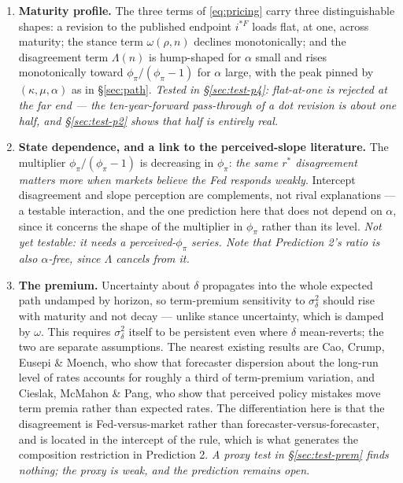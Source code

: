 \documentclass[11pt]{article}
\begin{document}
\begin{enumerate}
and downward disagreements are mirror images. Caballero \& Simsek's premium is genuinely
sign-dependent; this model is not, and the differentiation from them rests on the maturity
profile and the composition ratio in Prediction 2 rather than on any asymmetry. Generating
asymmetry would require a nonlinearity --- an occasionally-binding lower bound, or
state-dependent $\phi_\pi$ --- which is not in the present specification. \emph{Tested in
\S\ref{sec:test-sign}: symmetry is not rejected ($p=0.79$--$0.98$).}
\item \textbf{Maturity profile.} The three terms of \eqref{eq:pricing} carry three
distinguishable shapes: a revision to the published endpoint $i^{*F}$ loads flat, at one, across
maturity; the stance term $\omega(\rho,n)$ declines monotonically; and the disagreement term
$\Lambda(n)$ is hump-shaped for $\alpha$ small and rises monotonically toward
$\phi_\pi/(\phi_\pi-1)$ for $\alpha$ large, with the peak pinned by $(\kappa,\mu,\alpha)$ as in
\S\ref{sec:path}. \emph{Tested in \S\ref{sec:test-p4}: flat-at-one is rejected at the far
end --- the ten-year-forward pass-through of a dot revision is about one half, and
\S\ref{sec:test-p2} shows that half is entirely real.}
\item \textbf{State dependence, and a link to the perceived-slope literature.} The multiplier
$\phi_\pi/(\phi_\pi-1)$ is decreasing in $\phi_\pi$: \emph{the same $r^{*}$ disagreement matters
more when markets believe the Fed responds weakly}. Intercept disagreement and slope perception
are complements, not rival explanations --- a testable interaction, and the one prediction here
that does not depend on $\alpha$, since it concerns the shape of the multiplier in $\phi_\pi$
rather than its level. \emph{Not yet testable: it needs a perceived-$\phi_\pi$ series.
Note that Prediction 2's ratio is also $\alpha$-free, since $\Lambda$ cancels from it.}
\item \textbf{The premium.} Uncertainty about $\delta$ propagates into the whole expected path
undamped by horizon, so term-premium sensitivity to $\sigma^2_\delta$ should rise with maturity
and not decay --- unlike stance uncertainty, which is damped by $\omega$. This requires
$\sigma^2_\delta$ itself to be persistent even where $\delta$ mean-reverts; the two are separate
assumptions. The nearest existing results are Cao, Crump, Eusepi \& Moench, who show that
forecaster dispersion about the long-run level of rates accounts for roughly a third of
term-premium variation, and Cieslak, McMahon \& Pang, who show that perceived policy mistakes
move term premia rather than expected rates. The differentiation here is that the disagreement
is Fed-versus-market rather than forecaster-versus-forecaster, and is located in the intercept
of the rule, which is what generates the composition restriction in Prediction 2. \emph{A
proxy test in \S\ref{sec:test-prem} finds nothing; the proxy is weak, and the prediction
remains open.}
\end{enumerate}
\end{document}
